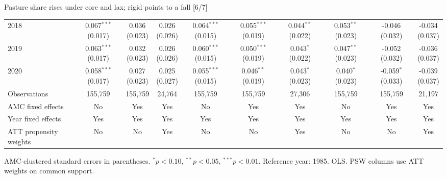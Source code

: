 \documentclass[aspectratio=169]{beamer}
\begin{document}
\begin{frame}{Pasture share rises under core and lax; rigid points to a fall [6/7]}
{\begin{tabular}{@{}l*{9}{c}@{}}
2018 & \shortstack{0.067$^{***}$\\(0.017)} & \shortstack{0.036\\(0.023)} & \shortstack{0.026\\(0.026)} & \shortstack{0.064$^{***}$\\(0.015)} & \shortstack{0.055$^{***}$\\(0.019)} & \shortstack{0.044$^{**}$\\(0.022)} & \shortstack{0.053$^{**}$\\(0.023)} & \shortstack{-0.046\\(0.032)} & \shortstack{-0.034\\(0.037)} \\
2019 & \shortstack{0.063$^{***}$\\(0.017)} & \shortstack{0.032\\(0.023)} & \shortstack{0.026\\(0.026)} & \shortstack{0.060$^{***}$\\(0.015)} & \shortstack{0.050$^{***}$\\(0.019)} & \shortstack{0.043$^{*}$\\(0.022)} & \shortstack{0.047$^{**}$\\(0.023)} & \shortstack{-0.052\\(0.032)} & \shortstack{-0.036\\(0.037)} \\
2020 & \shortstack{0.058$^{***}$\\(0.017)} & \shortstack{0.027\\(0.023)} & \shortstack{0.025\\(0.027)} & \shortstack{0.055$^{***}$\\(0.015)} & \shortstack{0.046$^{**}$\\(0.019)} & \shortstack{0.043$^{*}$\\(0.023)} & \shortstack{0.040$^{*}$\\(0.023)} & \shortstack{-0.059$^{*}$\\(0.033)} & \shortstack{-0.039\\(0.037)} \\
\midrule
Observations & 155,759 & 155,759 & 24,764 & 155,759 & 155,759 & 27,306 & 155,759 & 155,759 & 21,197 \\
AMC fixed effects & No & Yes & Yes & No & Yes & Yes & No & Yes & Yes \\
Year fixed effects & Yes & Yes & Yes & Yes & Yes & Yes & Yes & Yes & Yes \\
ATT propensity weights & No & No & Yes & No & No & Yes & No & No & Yes \\
\bottomrule
\end{tabular}%
}
\vspace{0.1em}
{\tiny\color{ZMidGray} AMC-clustered standard errors in parentheses. $^{*}p<0.10$, $^{**}p<0.05$, $^{***}p<0.01$. Reference year: 1985. OLS. PSW columns use ATT weights on common support.}
\end{frame}
\end{document}

